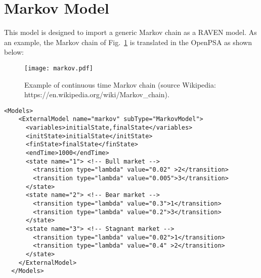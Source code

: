 \section{Markov Model}
\label{sec:MarkovModel}

This model is designed to import a generic Markov chain as a RAVEN model.
As an example, the Markov chain of Fig.~\ref{fig:markov} is translated in the OpenPSA as shown below:

\begin{figure}
    \centering
    \centerline{\texttt{[image: markov.pdf]}} 
    \caption{Example of continuous time Markov chain (source Wikipedia: https://en.wikipedia.org/wiki/Markov\_chain).}
    \label{fig:markov}
\end{figure}

\begin{lstlisting}[style=XML,morekeywords={anAttribute},caption=Markov model input example., label=lst:Markov_InputExample]
  <Models>
    <ExternalModel name="markov" subType="MarkovModel">
      <variables>initialState,finalState</variables>
      <initState>initialState</initState>
      <finState>finalState</finState>
      <endTime>1000</endTime>
      <state name="1"> <!-- Bull market -->
        <transition type="lambda" value="0.02" >2</transition>
        <transition type="lambda" value="0.005">3</transition>
      </state>
      <state name="2"> <!-- Bear market -->
        <transition type="lambda" value="0.3">1</transition>
        <transition type="lambda" value="0.2">3</transition>
      </state>
      <state name="3"> <!-- Stagnant market -->
        <transition type="lambda" value="0.02">1</transition>
        <transition type="lambda" value="0.4" >2</transition>
      </state>      
    </ExternalModel>
  </Models>
\end{lstlisting}

